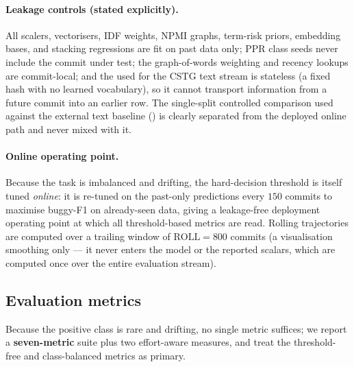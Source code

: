 	\paragraph{Leakage controls (stated explicitly).} All scalers, vectorisers, IDF
	weights, NPMI graphs, term-risk priors, embedding bases, and stacking regressions are
	fit on past data only; PPR class seeds never include the commit under test; the
	graph-of-words weighting and recency lookups are commit-local; and the
	 used for the CSTG text stream is stateless (a fixed hash with
	no learned vocabulary), so it cannot transport information from a future commit into an
	earlier row. The single-split controlled comparison used against the external text
	baseline () is clearly separated from the deployed online
	path and never mixed with it.
	
	\paragraph{Online operating point.} Because the task is imbalanced and drifting, the
	hard-decision threshold is itself tuned \emph{online}: it is re-tuned on the past-only
	predictions every $150$ commits to maximise buggy-F1 on already-seen data, giving a
	leakage-free deployment operating point at which all threshold-based metrics are read.
	Rolling trajectories are computed over a trailing window of $\text{ROLL}=800$ commits
	(a visualisation smoothing only --- it never enters the model or the reported scalars,
	which are computed once over the entire evaluation stream).
	
	\subsection{Evaluation metrics}
	\label{sec:setup-metrics}
	
	Because the positive class is rare and drifting, no single metric suffices; we report a
	\textbf{seven-metric} suite plus two effort-aware measures, and treat the
	threshold-free and class-balanced metrics as primary.
	
